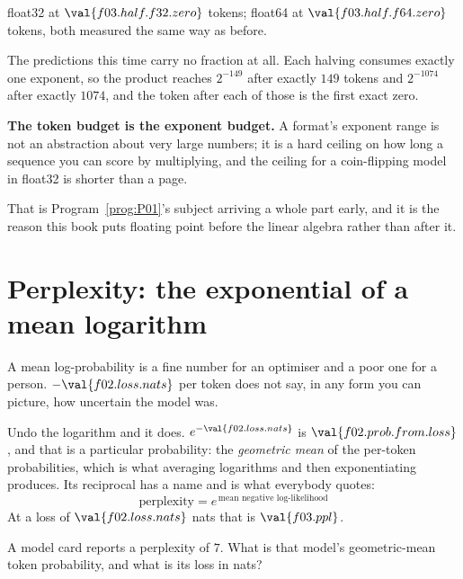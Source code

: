 \begin{fr}
\begin{ansblock}
float32 at $\val{f03.half.f32.zero}$ tokens; float64 at
$\val{f03.half.f64.zero}$ tokens, both measured the same way as before.

The predictions this time carry no fraction at all. Each halving consumes
exactly one exponent, so the product reaches $2^{-149}$ after exactly $149$
tokens and $2^{-1074}$ after exactly $1074$, and the token after each of those
is the first exact zero.
\end{ansblock}

\textbf{The token budget is the exponent budget.} A format's exponent range is
not an abstraction about very large numbers; it is a hard ceiling on how long a
sequence you can score by multiplying, and the ceiling for a coin-flipping
model in float32 is shorter than a page.

That is Program~\ref{prog:P01}'s subject arriving a whole part early, and it is
the reason this book puts floating point before the linear algebra rather than
after it.
\end{fr}

\section{Perplexity: the exponential of a mean logarithm}
\label{sec:F03-perplexity}

\begin{fr}
A mean log-probability is a fine number for an optimiser and a poor one for a
person. $-\val{f02.loss.nats}$ per token does not say, in any form you can
picture, how uncertain the model was.

Undo the logarithm and it does. $e^{-\val{f02.loss.nats}}$ is
$\val{f02.prob.from.loss}$, and that is a particular probability: the
\emph{geometric mean} of the per-token probabilities, which is what averaging
logarithms and then exponentiating produces. Its reciprocal has a name and is
what everybody quotes:
\[ \text{perplexity} = e^{\,\text{mean negative log-likelihood}} \]
At a loss of $\val{f02.loss.nats}$ nats that is $\val{f03.ppl}$.

A model card reports a perplexity of $7$. What is that model's geometric-mean
token probability, and what is its loss in nats?
\nextframe
\end{fr}


